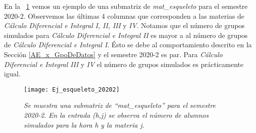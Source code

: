 En la \figurename{~\ref{esqueleto20202}} vemos un ejemplo de una submatriz de \textit{mat\_esqueleto} para el semestre 2020-2. Observemos las últimas 4 columnas que corresponden a las materias de \textit{Cálculo Diferencial e Integral I, II, III} y \textit{IV}. Notamos que el número de grupos simulados para \textit{Cálculo Diferencial e Integral II} es mayor a al número de grupos de \textit{Cálculo Diferencial e Integral I}. Ésto se debe al comportamiento descrito en la Sección \ref{AE_x_GpoDeDatos} y el semestre 2020-2 es par. Para \textit{Cálculo Diferencial e Integral III} y \textit{IV} el número de grupos simulados es prácticamente igual.

\begin{figure}[H]
\centering
\texttt{[image: Ej\_esqueleto\_20202]} %
\caption[\textit{Ejemplo de esqueleto para el semestre 2020-2}]{\textit{Se muestra una submatriz de ``mat\_esqueleto'' para el semestre 2020-2. En la entrada (h,j) se observa el número de alumnos simulados para la hora h y la materia j.}}\label{esqueleto20202}
\end{figure}


